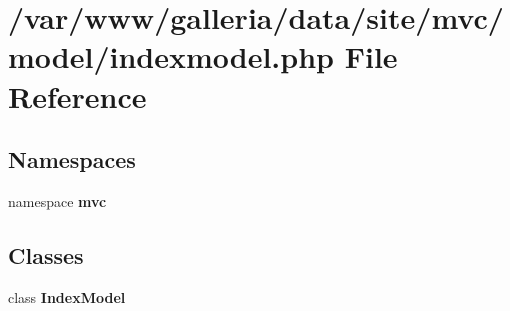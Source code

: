 \section{/var/www/galleria/data/site/mvc/model/indexmodel.php File Reference}
\label{indexmodel_8php}
\subsection*{Namespaces}
\begin{CompactItemize}
\item 
namespace {\bf mvc}
\end{CompactItemize}
\subsection*{Classes}
\begin{CompactItemize}
\item 
class {\bf IndexModel}
\end{CompactItemize}
